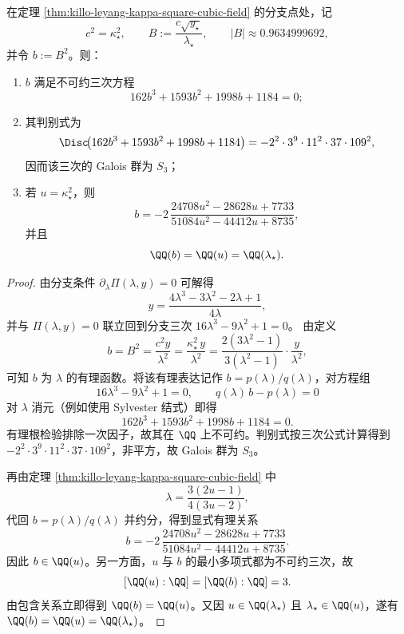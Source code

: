 \begin{theorem}\label{thm:killo-leyang-B-square-cubic-and-rational-intertwine}
在定理 \ref{thm:killo-leyang-kappa-square-cubic-field} 的分支点处，记
\[
c^2=\kappa_\star^2,\qquad
B:=\frac{c\sqrt{y_\star}}{\lambda_\star},\qquad
|B|\approx 0.9634999692,
\]
并令 \(b:=B^2\)。则：
\begin{enumerate}
  \item \(b\) 满足不可约三次方程
  \[
  162b^3+1593b^2+1998b+1184=0;
  \]
  \item 其判别式为
  \[
  \Disc\!\bigl(162b^3+1593b^2+1998b+1184\bigr)
  =-2^{2}\cdot 3^{9}\cdot 11^{2}\cdot 37\cdot 109^{2},
  \]
  因而该三次的 Galois 群为 \(S_3\)；
  \item 若 \(u=\kappa_\star^2\)，则
  \[
  b
  =
  -2\,
  \frac{24708u^2-28628u+7733}{51084u^2-44412u+8735},
  \]
  并且
  \[
  \QQ(b)=\QQ(u)=\QQ(\lambda_\star).
  \]
\end{enumerate}
\end{theorem}
\begin{proof}
由分支条件 \(\partial_\lambda\Pi(\lambda,y)=0\) 可解得
\[
y=\frac{4\lambda^3-3\lambda^2-2\lambda+1}{4\lambda},
\]
并与 \(\Pi(\lambda,y)=0\) 联立回到分支三次
\(
16\lambda^3-9\lambda^2+1=0
\)。
由定义
\[
b=B^2=\frac{c^2y}{\lambda^2}
=\frac{\kappa_\star^2\,y}{\lambda^2}
=\frac{2(3\lambda^2-1)}{3(\lambda^2-1)}\cdot\frac{y}{\lambda^2},
\]
可知 \(b\) 为 \(\lambda\) 的有理函数。将该有理表达记作 \(b=p(\lambda)/q(\lambda)\)，对方程组
\[
16\lambda^3-9\lambda^2+1=0,\qquad q(\lambda)\,b-p(\lambda)=0
\]
对 \(\lambda\) 消元（例如使用 Sylvester 结式）即得
\[
162b^3+1593b^2+1998b+1184=0.
\]
有理根检验排除一次因子，故其在 \(\QQ\) 上不可约。判别式按三次公式计算得到
\(
-2^{2}\cdot 3^{9}\cdot 11^{2}\cdot 37\cdot 109^{2}
\)，非平方，故 Galois 群为 \(S_3\)。

再由定理 \ref{thm:killo-leyang-kappa-square-cubic-field} 中
\[
\lambda=\frac{3(2u-1)}{4(3u-2)},
\]
代回 \(b=p(\lambda)/q(\lambda)\) 并约分，得到显式有理关系
\[
b=-2\,
\frac{24708u^2-28628u+7733}{51084u^2-44412u+8735}.
\]
因此 \(b\in\QQ(u)\)。另一方面，\(u\) 与 \(b\) 的最小多项式都为不可约三次，故
\[
[\QQ(u):\QQ]=[\QQ(b):\QQ]=3.
\]
由包含关系立即得到 \(\QQ(b)=\QQ(u)\)。又因 \(u\in\QQ(\lambda_\star)\) 且 \(\lambda_\star\in\QQ(u)\)，遂有
\(\QQ(b)=\QQ(u)=\QQ(\lambda_\star)\)。
\end{proof}
